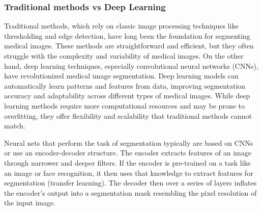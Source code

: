 \subsubsection*{Traditional methods vs Deep Learning}

Traditional methods, which rely on classic image processing techniques like thresholding and edge detection, have long been the foundation for segmenting medical images. These methods are straightforward and efficient, but they often struggle with the complexity and variability of medical images. On the other hand, deep learning techniques, especially convolutional neural networks (CNNs), have revolutionized medical image segmentation. Deep learning models can automatically learn patterns and features from data, improving segmentation accuracy and adaptability across different types of medical images. While deep learning methods require more computational resources and may be prone to overfitting, they offer flexibility and scalability that traditional methods cannot match.

Neural nets that perform the task of segmentation typically are based on CNNs or use an encoder-decoder structure. The encoder extracts features of an image through narrower and deeper filters. If the encoder is pre-trained on a task like an image or face recognition, it then uses that knowledge to extract features for segmentation (transfer learning). The decoder then over a series of layers inflates the encoder’s output into a segmentation mask resembling the pixel resolution of the input image.

